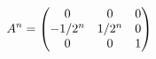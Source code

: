 \documentclass[preview]{standalone}
\begin{document}
\begin{align*}
\special{dvisvgm:raw <g id='unique000'>}A^n=\begin{pmatrix}0&0&0\\-1/2^n&1/2^n&0\\0&0&1\end{pmatrix}\special{dvisvgm:raw </g>}
\end{align*}
\end{document}
